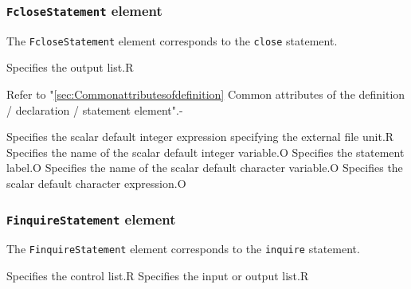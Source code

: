 \subsubsection{ {\tt FcloseStatement} element}

The {\tt FcloseStatement} element corresponds to the {\tt close} statement.


\begin{XcodeMLChildElements}
{Specifies the output list.}{R}
\end{XcodeMLChildElements}

\begin{XcodeMLAttributes}
{Refer to "\ref{sec:Commonattributesofdefinition} Common attributes of the definition / declaration / statement element".}{-}
\end{XcodeMLAttributes}

\begin{XcodeMLControlList}
{Specifies the scalar default integer expression specifying the external file unit.}{R}
{Specifies the name of the scalar default integer variable.}{O}
{Specifies the statement label.}{O}
{Specifies the name of the scalar default character variable.}{O}
{Specifies the scalar default character expression.}{O}
\end{XcodeMLControlList}


\subsubsection{ {\tt FinquireStatement} element}

The {\tt FinquireStatement} element corresponds to the {\tt inquire} statement.


\begin{XcodeMLChildElements}
{Specifies the control list.}{R}
{Specifies the input or output list.}{R}
\end{XcodeMLChildElements}

